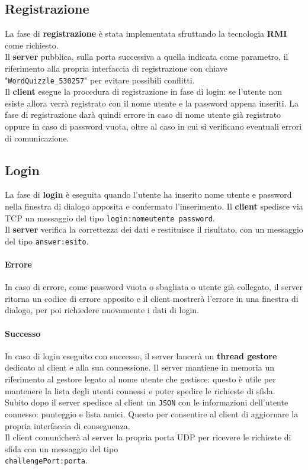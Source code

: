 \documentclass[10pt]{article}
\begin{document}
{\subsection{Registrazione}
La fase di \textbf{registrazione} è stata implementata sfruttando la tecnologia \textbf{RMI} come richiesto.\\Il \textbf{server} pubblica, sulla porta successiva a quella indicata come parametro, il riferimento alla propria interfaccia di registrazione con chiave "\texttt{WordQuizzle\_530257}" per evitare possibili conflitti.\\
Il \textbf{client} esegue la procedura di registrazione in fase di login: se l'utente non esiste allora verrà registrato con il nome utente e la password appena inseriti. La fase di registrazione darà quindi errore in caso di nome utente già registrato oppure in caso di password vuota, oltre al caso in cui si verificano eventuali errori di comunicazione.

\subsection{Login}
La fase di \textbf{login} è eseguita quando l'utente ha inserito nome utente e password nella finestra di dialogo apposita e confermato l'inserimento. Il \textbf{client} spedisce via TCP un messaggio del tipo \texttt{login:nomeutente password}.\\
Il \textbf{server} verifica la correttezza dei dati e restituisce il risultato, con un messaggio del tipo \texttt{answer:esito}.
\paragraph{Errore} In caso di errore, come password vuota o sbagliata o utente già collegato, il server ritorna un codice di errore apposito e il client mostrerà l'errore in una finestra di dialogo, per poi richiedere nuovamente i dati di login.
\paragraph{Successo} In caso di login eseguito con successo, il server lancerà un \textbf{thread gestore} dedicato al client e alla sua connessione. Il server mantiene in memoria un riferimento al gestore legato al nome utente che gestisce: questo è utile per mantenere la lista degli utenti connessi e poter spedire le richieste di sfida.\\
Subito dopo il server spedisce al client un \texttt{JSON} con le informazioni dell'utente connesso: punteggio e lista amici. Questo per consentire al client di aggiornare la propria interfaccia di conseguenza.\\
Il client comunicherà al server la propria porta UDP per ricevere le richieste di sfida con un messaggio del tipo\\\texttt{challengePort:porta}.

}
\end{document}
